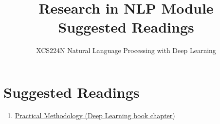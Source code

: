 \documentclass{article}
\title{Research in NLP Module Suggested Readings}
\author{XCS224N Natural Language Processing with Deep Learning}
\date{}
\begin{document}
\maketitle

\section{Suggested Readings}
\begin{enumerate}
    \item \href{https://www.deeplearningbook.org/contents/guidelines.html}{Practical Methodology (Deep Learning book chapter)}
\end{enumerate}
\end{document}
